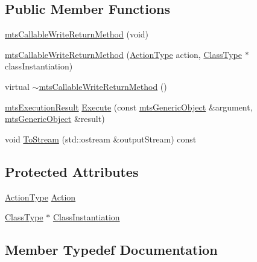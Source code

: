 \subsection*{Public Member Functions}
\begin{DoxyCompactItemize}
\item 
\hyperlink{classmts_callable_write_return_method_a772c565f1a82229cbf1be0cd257ddd98}{mts\+Callable\+Write\+Return\+Method} (void)
\item 
\hyperlink{classmts_callable_write_return_method_ab131f7ec5ecbf8b49fa51a7e09163b6b}{mts\+Callable\+Write\+Return\+Method} (\hyperlink{classmts_callable_write_return_method_a650562eae4db20a5cfbbff0f9f7e1a0a}{Action\+Type} action, \hyperlink{classmts_callable_write_return_method_a51dbe6298941ab172d83182c8188092d}{Class\+Type} $\ast$class\+Instantiation)
\item 
virtual \hyperlink{classmts_callable_write_return_method_a894a51147b26a6b6da76ffd32730d383}{$\sim$mts\+Callable\+Write\+Return\+Method} ()
\item 
\hyperlink{classmts_execution_result}{mts\+Execution\+Result} \hyperlink{classmts_callable_write_return_method_a18090c504b35a9f4142fd1f64365a1db}{Execute} (const \hyperlink{classmts_generic_object}{mts\+Generic\+Object} \&argument, \hyperlink{classmts_generic_object}{mts\+Generic\+Object} \&result)
\item 
void \hyperlink{classmts_callable_write_return_method_a5b79eed629e5634a62de1a6056571686}{To\+Stream} (std\+::ostream \&output\+Stream) const 
\end{DoxyCompactItemize}
\subsection*{Protected Attributes}
\begin{DoxyCompactItemize}
\item 
\hyperlink{classmts_callable_write_return_method_a650562eae4db20a5cfbbff0f9f7e1a0a}{Action\+Type} \hyperlink{classmts_callable_write_return_method_a3602dcc1749010bd68b5797ea137fd44}{Action}
\item 
\hyperlink{classmts_callable_write_return_method_a51dbe6298941ab172d83182c8188092d}{Class\+Type} $\ast$ \hyperlink{classmts_callable_write_return_method_abf8e145001a1e02c63a7cc66ee87f066}{Class\+Instantiation}
\end{DoxyCompactItemize}


\subsection{Member Typedef Documentation}
\hypertarget{classmts_callable_write_return_method_a650562eae4db20a5cfbbff0f9f7e1a0a}{}
